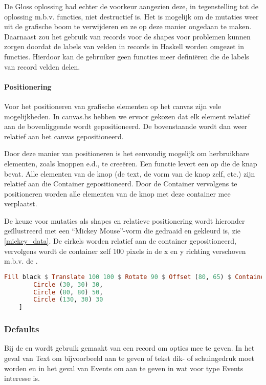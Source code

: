 De Gloss oplossing had echter de voorkeur aangezien deze, in tegenstelling tot de oplossing m.b.v. functies, niet destructief is. Het is mogelijk om de mutaties weer uit de grafische boom te verwijderen en ze op deze manier ongedaan te maken. Daarnaast zou het gebruik van records voor de shapes voor problemen kunnen zorgen doordat de labels van velden in records in Haskell worden omgezet in functies. Hierdoor kan de gebruiker geen functies meer defini\"eren die de labels van record velden delen.

\paragraph{Positionering}
Voor het positioneren van grafische elementen op het canvas zijn vele mogelijkheden. In canvas.hs hebben we ervoor gekozen dat elk element relatief aan de bovenliggende  wordt gepositioneerd. De bovenstaande  wordt dan weer relatief aan het canvas gepositioneerd. 

Door deze manier van positioneren is het eenvoudig mogelijk om herbruikbare elementen, zoals knoppen e.d., te creeëren. Een functie levert een  op die de knap bevat. Alle elementen van de knop (de text, de vorm van de knop zelf, etc.) zijn relatief aan die Container gepositioneerd. Door de Container vervolgens te positioneren worden alle elementen van de knop met deze container mee verplaatst. 

De keuze voor mutaties als shapes en relatieve positionering wordt hieronder geïllustreerd met een ``Mickey Mouse''-vorm die gedraaid en gekleurd is, zie \autoref{mickey_data}. De cirkels worden relatief aan de container gepositioneerd, vervolgens wordt de container zelf 100 pixels in de x en y richting verschoven m.b.v. de . 

\begin{lstlisting}[style=densecode, language=Haskell, caption=Mickey-figuur volgens het Canvas.hs gegevensmodel, label=mickey_data]
Fill black $ Translate 100 100 $ Rotate 90 $ Offset (80, 65) $ Container 160 130 [
        Circle (30, 30) 30,
        Circle (80, 80) 50,
        Circle (130, 30) 30
    ]
\end{lstlisting}

\subsubsection{Defaults}
Bij de  en  wordt gebruik gemaakt van een record om opties mee te geven. In het geval van Text om bijvoorbeeld aan te geven of tekst dik- of schuingedruk moet worden en in het geval van Events om aan te geven in wat voor type Events interesse is. 

